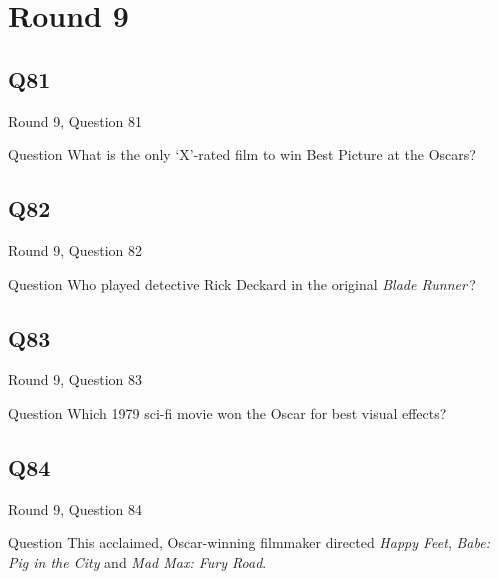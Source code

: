 \documentclass[11pt]{beamer}
\begin{document}
\section{Round 9}
    

\subsection*{Q81}
\begin{frame}[t]{Round 9, Question 81}
\vspace{2em}
\begin{block}{Question}
What is the only `X'-rated film to win Best Picture at the Oscars?
\end{block}
\end{frame}
    

\subsection*{Q82}
\begin{frame}[t]{Round 9, Question 82}
\vspace{2em}
\begin{block}{Question}
Who played detective Rick Deckard in the original \emph{Blade Runner}\,?
\end{block}
\end{frame}
    

\subsection*{Q83}
\begin{frame}[t]{Round 9, Question 83}
\vspace{2em}
\begin{block}{Question}
Which 1979 sci-fi movie won the Oscar for best visual effects?
\end{block}
\end{frame}
    

\subsection*{Q84}
\begin{frame}[t]{Round 9, Question 84}
\vspace{2em}
\begin{block}{Question}
This acclaimed, Oscar-winning filmmaker directed \emph{Happy Feet}, \emph{Babe: Pig in the City} and \emph{Mad Max: Fury Road}.
\end{block}
\end{frame}
    
\end{document}
